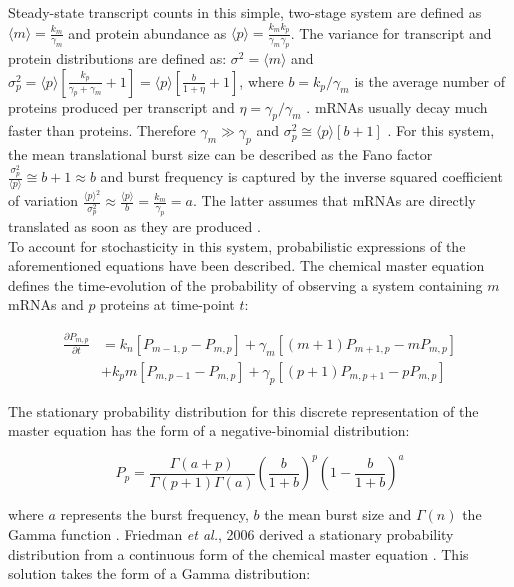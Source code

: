 \doublespacing
\noindent Steady-state transcript counts in this simple, two-stage system are defined as $\langle{}m\rangle{}=\frac{k_m}{\gamma_m}$  and protein abundance as $\langle{}p\rangle{}=\frac{k_mk_p}{\gamma_m\gamma_p }$. The variance for transcript and protein distributions are defined as: $\sigma^2=\langle{}m\rangle{}$ and $\sigma_p^2=\langle{}p\rangle{}\left[\frac{k_p}{\gamma_p+\gamma_m}+1\right]=\langle{}p\rangle{}\left[\frac{b}{1+\eta}+1\right]$, where $b=k_p/\gamma_m$  is the average number of proteins produced per transcript and $\eta=\gamma_p/\gamma_m$  \citep{Tsimring2014, Thattai2001}. mRNAs usually decay much faster than proteins. Therefore $\gamma_m\gg{}\gamma_p$ and $\sigma_p^2\cong\langle{}p\rangle{}\left[b+1\right]$ \citep{Thattai2001}. For this system, the mean translational burst size can be described as the Fano factor $\frac{\sigma_p^2}{\langle{}p\rangle}\cong{}b+1\approx{}b$ and burst frequency is captured by the inverse squared coefficient of variation $\frac{\langle{}p\rangle{}^2}{\sigma_p^2}\approx{}\frac{\langle{}p\rangle{}}{b}=\frac{k_m}{\gamma_p}=a$. The latter assumes that mRNAs are directly translated as soon as they are produced \citep{Friedman2006}.\\

\onehalfspacing
\noindent To account for stochasticity in this system, probabilistic expressions of the aforementioned equations have been described. The chemical master equation defines the time-evolution of the probability of observing a system containing $m$ mRNAs and $p$ proteins at time-point $t$:

\begin{align}
\frac{\partial{}P_{m,p}}{\partial{}t}&=k_n\left[P_{m-1,p}-P_{m,p}\right]+\gamma_m\left[(m+1)P_{m+1,p}-mP_{m,p}\right] \nonumber \\
&+k_pm\left[P_{m,p-1}-P_{m,p}\right]+\gamma_p\left[(p+1)P_{m,p+1}-pP_{m,p}\right]
\end{align}

\noindent The stationary probability distribution for this discrete representation of the master equation has the form of a negative-binomial distribution:

\begin{equation}
P_p=\frac{\Gamma(a+p)}{\Gamma(p+1)\Gamma(a)}\left(\frac{b}{1+b}\right)^p\left(1-\frac{b}{1+b}\right)^a
\end{equation}

\noindent where $a$ represents the burst frequency, $b$ the mean burst size and $\Gamma(n)$ the Gamma function \citep{Shahrezaei2008}. Friedman \textit{et al.}, 2006 derived a stationary probability distribution from a continuous form of the chemical master equation \citep{Friedman2006}. This solution takes the form of a Gamma distribution:

